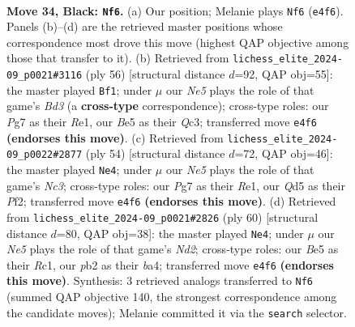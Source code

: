 \documentclass[11pt]{article}
\begin{document}
\clearpage

\begin{figure}[p]\centering
\begin{subfigure}{0.46\textwidth}\centering
\resizebox{\linewidth}{!}{%
\newchessgame
\chessboard[
  setfen={r1b5/ppp2ppk/7p/3qb3/BQ2n3/5P1P/PP4P1/R1B4K b - - 9 34},
  showmover=false,
  pgfstyle=straightmove, color=movearrow, markmove={e4-f6}
]}
\caption{}
\end{subfigure}\hfill
\begin{subfigure}{0.46\textwidth}\centering
\resizebox{\linewidth}{!}{%
\newchessgame
\chessboard[
  setfen={3r2k1/5pbp/2b2pp1/1pBq4/8/1PQB3P/2P2PP1/4R1K1 w - - 7 29},
  showmover=false,
  pgfstyle=straightmove, color=movearrow, markmove={d3-f1}
]}
\caption{}
\end{subfigure}
\\[4pt]
\begin{subfigure}{0.46\textwidth}\centering
\resizebox{\linewidth}{!}{%
\newchessgame
\chessboard[
  setfen={2r2k1r/1p3ppp/2b4q/p3BB2/3p2P1/P1N2Q2/1P3P1P/4R1K1 w - - 0 28},
  showmover=false,
  pgfstyle=straightmove, color=movearrow, markmove={c3-e4}
]}
\caption{}
\end{subfigure}\hfill
\begin{subfigure}{0.46\textwidth}\centering
\resizebox{\linewidth}{!}{%
\newchessgame
\chessboard[
  setfen={2r3k1/5p2/p2p2pp/3P2b1/bqB5/3Q3P/3N1PP1/2R3K1 w - - 2 31},
  showmover=false,
  pgfstyle=straightmove, color=movearrow, markmove={d2-e4}
]}
\caption{}
\end{subfigure}
\caption{\textbf{Move 34, Black: \texttt{Nf6}.} (a) Our position; Melanie plays \texttt{Nf6} (\texttt{e4f6}). Panels (b)--(d) are the retrieved master positions whose correspondence most drove this move (highest QAP objective among those that transfer to it). (b) Retrieved from \texttt{lichess\_elite\_2024-09\_p0021\#3116} (ply 56) [structural distance $d$=92, QAP obj=55]: the master played \texttt{Bf1}; under $\mu$ our \emph{Ne5} plays the role of that game's \emph{Bd3} (a \textbf{cross-type} correspondence); cross-type roles: our \emph{P}g7 as their \emph{R}e1, our \emph{B}e5 as their \emph{Q}c3; transferred move \texttt{e4f6} \textbf{(endorses this move)}. (c) Retrieved from \texttt{lichess\_elite\_2024-09\_p0022\#2877} (ply 54) [structural distance $d$=72, QAP obj=46]: the master played \texttt{Ne4}; under $\mu$ our \emph{Ne5} plays the role of that game's \emph{Nc3}; cross-type roles: our \emph{P}g7 as their \emph{R}e1, our \emph{Q}d5 as their \emph{P}f2; transferred move \texttt{e4f6} \textbf{(endorses this move)}. (d) Retrieved from \texttt{lichess\_elite\_2024-09\_p0021\#2826} (ply 60) [structural distance $d$=80, QAP obj=38]: the master played \texttt{Ne4}; under $\mu$ our \emph{Ne5} plays the role of that game's \emph{Nd2}; cross-type roles: our \emph{B}e5 as their \emph{R}c1, our \emph{p}b2 as their \emph{b}a4; transferred move \texttt{e4f6} \textbf{(endorses this move)}. Synthesis: 3 retrieved analogs transferred to \texttt{Nf6} (summed QAP objective 140, the strongest correspondence among the candidate moves); Melanie committed it via the \texttt{search} selector.}
\label{fig:thought-m67}
\end{figure}
\end{document}

